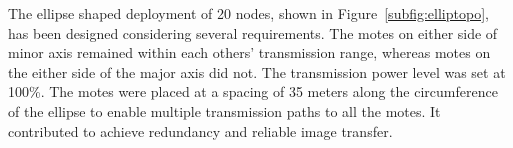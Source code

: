 \documentclass[conference,manuscript]{IEEEtran}
\newcommand{\notedme}[1]{\raisebox{0pt}[0pt][0pt]{\pdfcomment[open=true,color=blue]{#1}}}
\begin{document}


The ellipse shaped deployment of 20 nodes, shown in Figure~\ref{subfig:elliptopo}, has been designed considering several requirements.
The motes on either side of minor axis remained within each others' transmission range, whereas motes on the either side of the major axis did not.
The transmission power level was set at 100\%. 
The motes were placed at a spacing of 35 meters along the circumference of the ellipse to enable multiple transmission paths to all the motes.
It contributed to achieve  redundancy and  reliable image transfer. 
\end{document}
